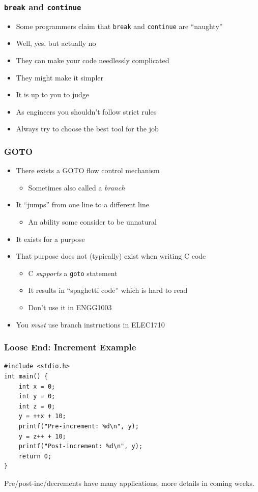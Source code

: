 \documentclass[14pt]{beamer}
\begin{document}
\begin{frame}
\frametitle{\texttt{break} and \texttt{continue}}
\begin{itemize}
\item Some programmers claim that \texttt{break} and \texttt{continue} are ``naughty''
\item Well, yes, but actually no
\item They can make your code needlessly complicated
\item They might make it simpler
\item It is up to you to judge
\item As engineers you shouldn't follow strict rules
\item Always try to choose the best tool for the job
\end{itemize}
\end{frame}

\begin{frame}
\frametitle{GOTO}
\begin{itemize}
\item There exists a GOTO flow control mechanism
	\begin{itemize}
		\item Sometimes also called a \textit{branch}
	\end{itemize}
\item It ``jumps'' from one line to a different line
	\begin{itemize}
		\item An ability some consider to be unnatural
	\end{itemize}
\item It exists for a purpose
\item That purpose does not (typically) exist when writing C code
	\begin{itemize}
		\item C \textit{supports} a \texttt{goto} statement
		\item It results in ``spaghetti code'' which is hard to read
		\item Don't use it in ENGG1003
	\end{itemize}
\item You \textit{must} use branch instructions in ELEC1710
\end{itemize}
\end{frame}

\begin{frame}[fragile]
\frametitle{Loose End: Increment Example}
\begin{lstlisting}[style=CStyle,caption=\texttt{increment.c}]
#include <stdio.h>
int main() {
	int x = 0;
	int y = 0;
	int z = 0;
	y = ++x + 10;
	printf("Pre-increment: %d\n", y);
	y = z++ + 10;
	printf("Post-increment: %d\n", y);
	return 0;
}
\end{lstlisting}
Pre/post-inc/decrements have many applications, more details in coming weeks.
\end{frame}
\end{document}
